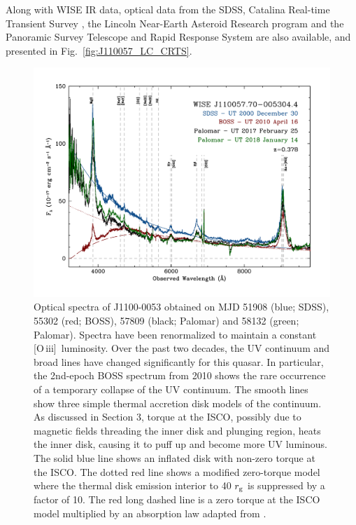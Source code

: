 \documentclass[a4paper,fleqn,usenatbib]{mnras}
\begin{document}
Along with WISE IR data, optical data from the SDSS, Catalina
Real-time Transient Survey \citep[CRTS;][]{Drake2009, Mahabal2011},
the Lincoln Near-Earth Asteroid Research \citep[LINEAR; ][]{Sesar2011}
program and the Panoramic Survey Telescope and Rapid Response System
\citep[PanSTARRS;][]{Kaiser2010, Stubbs2010, Tonry2012, Magnier2013}
are also available, and presented in Fig.~\ref{fig:J110057_LC_CRTS}.




\begin{figure}
  \centering
  \includegraphics[width=17.00cm, trim=0.0cm 0.0cm 0.0cm 0.0cm, clip]
  {w1100m0052_sdss2.pdf}
\vspace{-16pt}
  \caption[]{
    Optical spectra of J1100-0053 obtained on MJD 51908 (blue; SDSS),
    55302 (red; BOSS), 57809 (black; Palomar) and 58132 (green;
    Palomar). Spectra have been renormalized to maintain a constant
    [O\,{\sc iii}]\ luminosity. Over the past two decades, the UV
    continuum and broad lines have changed significantly for this quasar.
    In particular, the 2nd-epoch BOSS spectrum from 2010 shows the rare
    occurrence of a temporary collapse of the UV continuum.  
    The smooth lines show three simple thermal accretion disk models
    of the continuum.  As discussed in Section 3, torque at the ISCO,
    possibly due to magnetic fields threading the inner disk and plunging
    region, heats the inner disk, causing it to puff up and become more UV
    luminous. The solid blue line shows an inflated disk with non-zero
    torque at the ISCO. The dotted red line shows a modified zero-torque
    model where the thermal disk emission interior to 40 $r_{\rm g}$
    is suppressed by a factor of 10.  The red long dashed line is a zero
    torque at the ISCO model multiplied by an absorption law adapted from
    \citet{Guo2016}.
}
  \label{fig:J110057_spectra}
\end{figure}
\end{document}
